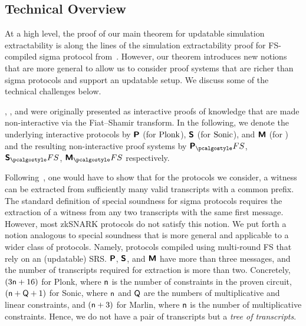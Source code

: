 \subsection{Technical Overview}

At a high level, the proof of our main theorem for updatable simulation
extractability is along the lines of the simulation extractability proof for
FS-compiled sigma protocol from~\cite{INDOCRYPT:FKMV12}. However, our theorem
introduces new notions that are more general to allow us to consider proof
systems that are richer than sigma protocols and support an updatable setup. We
discuss some of the technical challenges below.

\plonk{}, \sonic{}, and \marlin{} were originally presented as interactive
proofs of knowledge that are made non-interactive via the Fiat--Shamir transform.
In the following, we denote the underlying interactive protocols by $\bm{\mathsf{P}}$
(for $\textnormal{{Plonk}}$), $\bm{\mathsf{S}}$ (for ${\textnormal{{Sonic}}}$), and $\bm{\mathsf{M}}$ (for \marlin) and
the resulting non-interactive proof systems by $\plonkprotfs$, $\sonicprotfs$,
$\marlinprotfs$ respectively.

Following~\cite{INDOCRYPT:FKMV12}, one would have to show that for the protocols
we consider, a witness can be extracted from sufficiently many valid transcripts
with a common prefix. The standard definition of special soundness for sigma
protocols requires the extraction of a witness from any two transcripts with the
same first message. However, most zkSNARK protocols do not satisfy this notion.
We put forth a notion analogous to special soundness that is more general and
applicable to a wider class of protocols. Namely, protocols compiled using multi-round FS that rely on an (updatable) SRS. $\bm{\mathsf{P}}$, $\bm{\mathsf{S}}$, and
$\bm{\mathsf{M}}$ have more than three messages, and the number of transcripts required for extraction is more
than two. Concretely, $(3 \mathsf{n} + 16)$ for Plonk, where $\mathsf{n}$ is the number of
constraints in the proven circuit, $(\mathsf{n} + \mathsf{Q} + 1)$ for Sonic, where $\mathsf{n}$ and $\mathsf{Q}$ are the numbers of multiplicative and
linear constraints, and $(\mathsf{n} + 3)$ for Marlin, where $\mathsf{n}$
is the number of multiplicative constraints. Hence, we do not have
a pair of transcripts but a \emph{tree of transcripts}.

